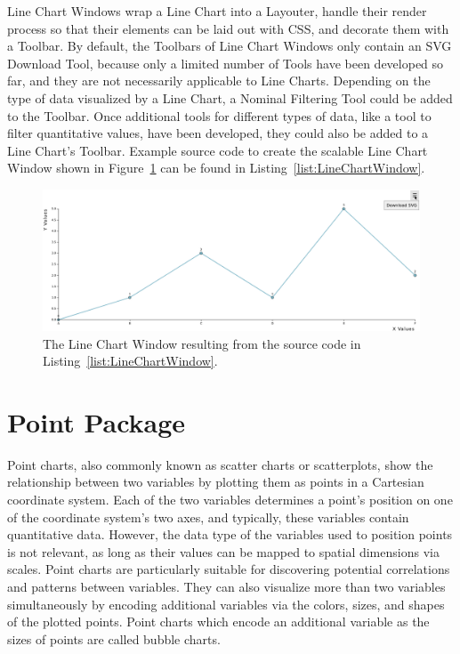 Line Chart Windows wrap a Line Chart into a Layouter, handle their
render process so that their elements can be laid out with CSS, and
decorate them with a Toolbar. By default, the Toolbars of Line Chart
Windows only contain an SVG Download Tool, because only a limited
number of Tools have been developed so far, and they are not
necessarily applicable to Line Charts. Depending on the type of data
visualized by a Line Chart, a Nominal Filtering Tool could be added to
the Toolbar. Once additional tools for different types of data, like a
tool to filter quantitative values, have been developed, they could
also be added to a Line Chart's Toolbar. Example source code to create
the scalable Line Chart Window shown in
Figure~\ref{fig:LineChartWindow} can be found in
Listing~\ref{list:LineChartWindow}.



\begin{figure}[tp]
\centering
\includegraphics[keepaspectratio,width=\linewidth,height=\halfh]
{images/line-chart-window.png}
\caption[Line Chart Window Example]{%
The Line Chart Window resulting from the source code in
Listing~\ref{list:LineChartWindow}.
}
\label{fig:LineChartWindow}
\end{figure}





\section{Point Package}

Point charts, also commonly known as scatter charts or scatterplots,
show the relationship between two variables by plotting them as points
in a Cartesian coordinate system. Each of the two variables determines
a point's position on one of the coordinate system's two axes, and
typically, these variables contain quantitative data. However, the
data type of the variables used to position points is not relevant, as
long as their values can be mapped to spatial dimensions via scales.
Point charts are particularly suitable for discovering potential
correlations and patterns between variables. They can also visualize
more than two variables simultaneously by encoding additional
variables via the colors, sizes, and shapes of the plotted points.
Point charts which encode an additional variable as the sizes of
points are called bubble charts.


